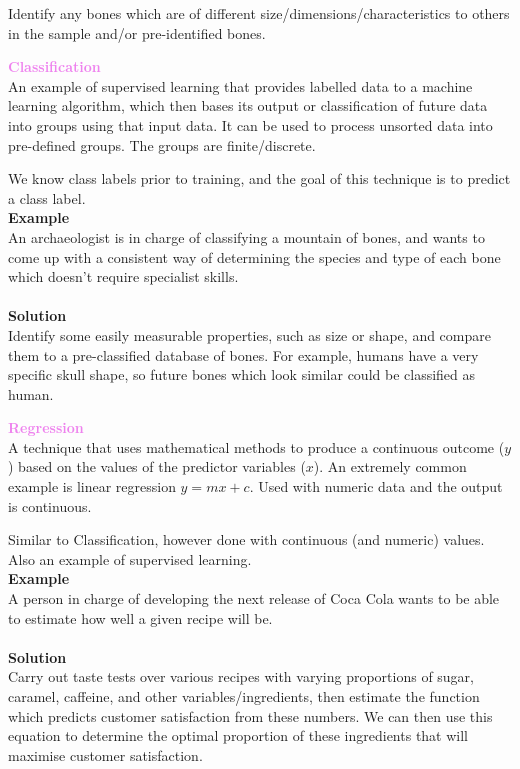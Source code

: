 \documentclass[a4paper,10pt]{article}
\begin{document}
Identify any bones which are of different size/dimensions/characteristics to others in the sample and/or pre-identified bones. 
\begin{shaded}
\noindent \textcolor{Violet}{\textbf{Classification}}\\
An example of supervised learning that provides labelled data to a machine learning algorithm, which then bases its output or classification of future data into groups using that input data. It can be used to process unsorted data into pre-defined groups. The groups are finite/discrete.  
\end{shaded}
\noindent We know class labels prior to training, and the goal of this technique is to predict a class label. \\
\noindent \textbf{Example}\\
An archaeologist is in charge of classifying a mountain of bones, and wants to come up with a consistent way of determining the species and type of each bone which doesn't require specialist skills. \\\\
\noindent \textbf{Solution}\\
Identify some easily measurable properties, such as size or shape, and compare them to a pre-classified database of bones. For example, humans have a very specific skull shape, so future bones which look similar could be classified as human.
\begin{shaded}
\noindent \textcolor{Violet}{\textbf{Regression}}\\
A technique that uses mathematical methods to produce a continuous outcome ($y$) based on the values of the predictor variables ($x$). An extremely common example is linear regression $y = mx + c$. Used with numeric data and the output is continuous. 
\end{shaded}
\noindent Similar to Classification, however done with continuous (and numeric) values. Also an example of supervised learning. \\
\noindent \textbf{Example}\\
A person in charge of developing the next release of Coca Cola wants to be able to estimate how well a given recipe will be. \\\\
\noindent \textbf{Solution}\\
Carry out taste tests over various recipes with varying proportions of sugar, caramel, caffeine, and other variables/ingredients, then estimate the function which predicts customer satisfaction from these numbers. We can then use this equation to determine the optimal proportion of these ingredients that will maximise customer satisfaction.
\newpage 
\end{document}
